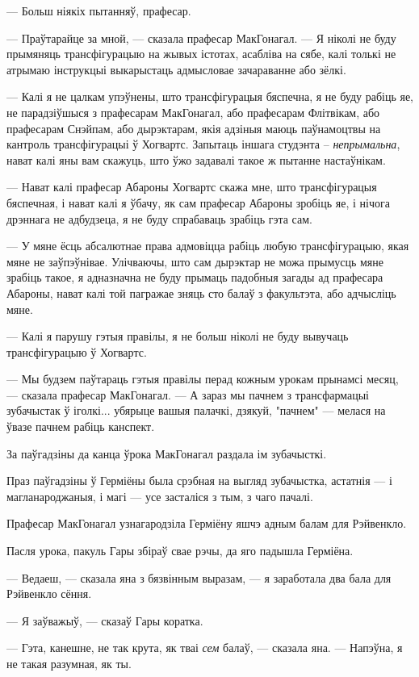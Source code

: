 --- Больш ніякіх пытанняў, прафесар.

--- Праўтарайце за мной, --- сказала прафесар МакГонагал. --- Я ніколі не буду 
прымяняць трансфігурацыю на жывых істотах, асабліва на сябе, калі толькі 
не атрымаю інструкцыі выкарыстаць адмысловае зачараванне або зёлкі.

--- Калі я не цалкам упэўнены, што трансфігурацыя бяспечна, я не буду 
рабіць яе, не парадзіўшыся з прафесарам МакГонагал, або прафесарам Флітвікам, або 
прафесарам Снэйпам, або дырэктарам, якія  адзіныя маюць паўнамоцтвы 
на кантроль трансфігурацыі ў Хогвартс. Запытаць іншага студэнта --  \emph{непрымальна},
нават калі яны вам скажуць, што ўжо задавалі такое ж пытанне настаўнікам.

--- Нават калі прафесар Абароны Хогвартс скажа мне, што трансфігурацыя бяспечная,
і нават калі я ўбачу, як сам прафесар Абароны зробіць яе, і нічога дрэннага не адбудзеца,
я не буду спрабаваць зрабіць гэта сам.

--- У мяне ёсць абсалютнае права адмовіцца рабіць любую трансфігурацыю, якая 
мяне не заўпэўнівае. Улічваючы, што сам дырэктар не можа прымусць мяне зрабіць такое,
я адназначна не буду прымаць падобныя загады ад прафесара Абароны, нават калі той
пагражае зняць сто балаў з факультэта, або адчысліць мяне.

--- Калі я парушу гэтыя правілы, я не больш ніколі не буду вывучаць трансфігурацыю 
ў Хогвартс. 

--- Мы будзем паўтараць гэтыя правілы перад кожным урокам прынамсі месяц, --- 
сказала прафесар МакГонагал. --- А зараз мы пачнем з трансфармацыі зубачыстак ў іголкі... 
убярыце вашыя палачкі, дзякуй, "пачнем" --- мелася на ўвазе пачнем рабіць канспект.

За паўгадзіны да канца ўрока МакГонагал раздала ім зубачысткі.

Праз паўгадзіны ў Герміёны была срэбная на выгляд зубачыстка, астатнія --- 
і магланароджаныя, і магі --- усе засталіся з тым, з чаго пачалі.

Прафесар МакГонагал узнагародзіла Герміёну яшчэ адным балам для Рэйвенкло.

\later

Пасля урока, пакуль Гары збіраў свае рэчы, да яго падышла Герміёна.

--- Ведаеш, --- сказала яна з бязвінным выразам, --- я заработала два бала 
для Рэйвенкло сёння.

--- Я заўважыў, --- сказаў Гары коратка.

--- Гэта, канешне, не так крута, як тваі  \emph{сем} балаў, --- сказала яна. ---
Напэўна, я не такая разумная, як ты.

